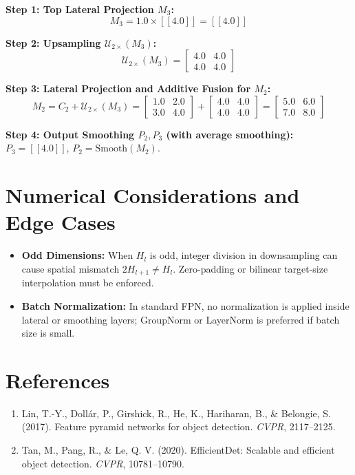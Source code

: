 \documentclass[11pt,a4paper]{article}
\theoremstyle{definition}
\begin{document}
\textbf{Step 1: Top Lateral Projection $M_3$:}
\begin{equation}
M_3 = 1.0 \times [[4.0]] = [[4.0]]
\end{equation}

\textbf{Step 2: Upsampling $\mathcal{U}_{2\times}(M_3)$:}
\begin{equation}
\mathcal{U}_{2\times}(M_3) = \begin{bmatrix} 4.0 & 4.0 \\ 4.0 & 4.0 \end{bmatrix}
\end{equation}

\textbf{Step 3: Lateral Projection and Additive Fusion for $M_2$:}
\begin{equation}
M_2 = C_2 + \mathcal{U}_{2\times}(M_3) = \begin{bmatrix} 1.0 & 2.0 \\ 3.0 & 4.0 \end{bmatrix} + \begin{bmatrix} 4.0 & 4.0 \\ 4.0 & 4.0 \end{bmatrix} = \begin{bmatrix} 5.0 & 6.0 \\ 7.0 & 8.0 \end{bmatrix}
\end{equation}

\textbf{Step 4: Output Smoothing $P_2, P_3$ (with average smoothing):}
$P_3 = [[4.0]]$, $P_2 = \text{Smooth}(M_2)$.

\section{Numerical Considerations and Edge Cases}

\begin{itemize}
    \item \textbf{Odd Dimensions:} When $H_l$ is odd, integer division in downsampling can cause spatial mismatch $2 H_{l+1} \ne H_l$. Zero-padding or bilinear target-size interpolation must be enforced.
    \item \textbf{Batch Normalization:} In standard FPN, no normalization is applied inside lateral or smoothing layers; GroupNorm or LayerNorm is preferred if batch size is small.
\end{itemize}

\section{References}
\begin{enumerate}
    \item Lin, T.-Y., Doll{\'a}r, P., Girshick, R., He, K., Hariharan, B., & Belongie, S. (2017). Feature pyramid networks for object detection. \emph{CVPR}, 2117--2125.
    \item Tan, M., Pang, R., & Le, Q. V. (2020). EfficientDet: Scalable and efficient object detection. \emph{CVPR}, 10781--10790.
\end{enumerate}
\end{document}
